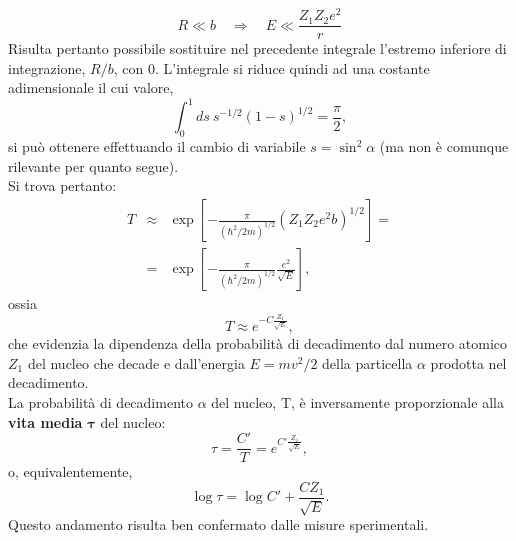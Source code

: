 \documentclass[a4paper,11pt,oneside]{book}
\begin{document}
\begin{equation}
R\ll b \quad \Rightarrow \quad E \ll \frac{Z_1 Z_2 e^2}{r}
\end{equation}
Risulta pertanto possibile sostituire nel precedente integrale l'estremo inferiore di integrazione, $R/b$, con $0$. L'integrale si riduce quindi ad una costante adimensionale il cui valore,
\begin{equation}
\int _{0} ^1 ds\ s^{-1/2} (1-s)^{1/2}= \frac{\pi}{2},
\end{equation}
si può ottenere effettuando il cambio di variabile $s= \sin^2 \alpha$ (ma non è comunque rilevante per quanto segue).\\
Si trova pertanto:
\begin{eqnarray}
T&\approx & \exp \left[ -\frac{\pi}{(\hbar ^2 /2m)^{1/2}}\left(Z_1 Z_2 e^2 b\right)^{1/2}\right]= \nonumber \\
&=&\exp \left[ -\frac{\pi}{(\hbar ^2 /2m)^{1/2}}\frac{e^2}{\sqrt{E}}\right],
\end{eqnarray}
ossia
\begin{equation}
T \approx e^{-C\frac{Z_1}{\sqrt{E}}},
\end{equation}
che evidenzia la dipendenza della probabilità di decadimento dal numero atomico $Z_1$ del nucleo che decade e dall'energia $E=mv^2/2$ della particella $\alpha$ prodotta nel decadimento.\\
La probabilità di decadimento $\alpha$ del nucleo, T, è inversamente proporzionale alla \textbf{vita media} $\mathbf{\tau}$ del nucleo:
\begin{equation}
\tau=\frac{C'}{T}=e^{C'\frac{Z_1}{\sqrt{E}}},
\end{equation}
o, equivalentemente,
\begin{equation}
\log \tau = \log C' + \frac{C Z_1}{\sqrt{E}}.
\end{equation}
Questo andamento risulta ben confermato dalle misure sperimentali.
\end{document}
